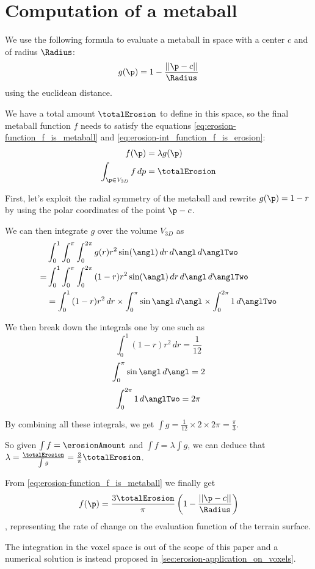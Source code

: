 \chapter{Computation of a metaball}
\label{sec:erosion-appendix_metaball}


We use the following formula to evaluate a metaball in space with a center $c$ and of radius $\Radius$:
$$ g(\p) = 1 - \frac{||\p - c||}{\Radius} $$
using the euclidean distance.

We have a total amount $\totalErosion$ to define in this space, so the final metaball function $f$ needs to satisfy the equations \eqref{eq:erosion-function_f_is_metaball} and \eqref{eq:erosion-int_function_f_is_erosion}:
\begin{align}
\label{eq:erosion-function_f_is_metaball}
f(\p) &= \lambda g(\p) \\
\label{eq:erosion-int_function_f_is_erosion}
\int_{\p \in V_{3D}}{f \, dp} &= \totalErosion
\end{align}

First, let's exploit the radial symmetry of the metaball and rewrite $g(\p) = 1 - r$ by using the polar coordinates of the point $\p - c$.

We can then integrate $g$ over the volume $V_{3D}$ as 
\begin{align}
&\int_{0}^{1}{ \int_{0}^{\pi}{ \int_{0}^{2\pi}{ g(r) r^2 \sin(\angl)\, dr} \, d\angl} \, d\anglTwo} \nonumber \\
= &\int_{0}^{1}{ \int_{0}^{\pi}{ \int_{0}^{2\pi}{ (1 - r) r^2 \sin(\angl)\, dr} \, d\angl} \, d\anglTwo} \nonumber \\
&= \int_{0}^{1}{ (1 - r)r^2 \, dr} \times \int_{0}^{\pi}{ \sin{\angl} \, d\angl } \times \int_{0}^{2\pi}{ 1 \, d\anglTwo} \nonumber
\end{align}

We then break down the integrals one by one such as 
$$ \int_{0}^{1}{ (1 - r)r^2 \, dr} = \frac{1}{12} \nonumber$$ 
$$ \int_{0}^{\pi}{ \sin{\angl} \, d\angl } = 2 \nonumber$$ 
$$ \int_{0}^{2\pi}{ 1 \, d\anglTwo} = 2 \pi \nonumber$$

By combining all these integrals, we get $\int{g} = \frac{1}{12} \times 2 \times 2\pi = \frac{\pi}{3}$.

So given $\int{f} = \erosionAmount$ and $\int{f} = \lambda \int{g}$, we can deduce that $\lambda = \frac{\totalErosion}{\int{g}} = \frac{3}{\pi}\totalErosion$.

From \eqref{eq:erosion-function_f_is_metaball} we finally get 
\begin{align} 
\label{eq:erosion-proofErosionMetaball}
f(\p) = \frac{3 \totalErosion}{\pi} \left(1 - \frac{||\p - c||}{\Radius} \right)
\end{align}
, representing the rate of change on the evaluation function of the terrain surface.

The integration in the voxel space is out of the scope of this paper and a numerical solution is instead proposed in \cref{sec:erosion-application_on_voxels}.